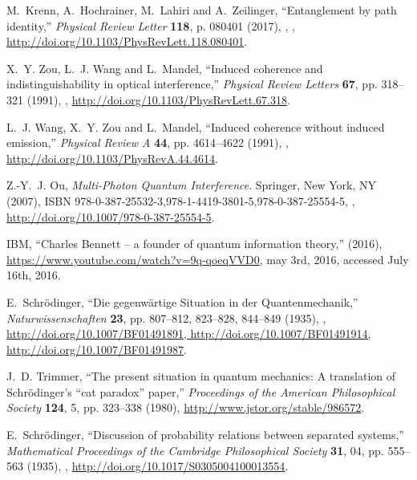 \documentclass{ws-book9x6}
\begin{document}
\begin{thebibliography}{24}
M.~Krenn, A.~Hochrainer, M.~Lahiri and A.~Zeilinger, \enquote{Entanglement by
  path identity,} \emph{Physical Review Letter} \textbf{118}, p. 080401 (2017),
  ,
  \href{http://arxiv.org/abs/arXiv:1610.00642}{},
  \url{http://doi.org/10.1103/PhysRevLett.118.080401}.

X.~Y. Zou, L.~J. Wang and L.~Mandel, \enquote{Induced coherence and
  indistinguishability in optical interference,} \emph{Physical Review Letters}
  \textbf{67}, pp. 318--321 (1991), ,
  \url{http://doi.org/10.1103/PhysRevLett.67.318}.

L.~J. Wang, X.~Y. Zou and L.~Mandel, \enquote{Induced coherence without induced
  emission,} \emph{Physical Review A} \textbf{44}, pp. 4614--4622 (1991),
  ,
  \url{http://doi.org/10.1103/PhysRevA.44.4614}.

Z.-Y.~J. Ou, \emph{Multi-Photon Quantum Interference}.
\newblock Springer, New York, NY (2007), ISBN
  978-0-387-25532-3,978-1-4419-3801-5,978-0-387-25554-5,
  ,
  \url{http://doi.org/10.1007/978-0-387-25554-5}.

IBM, \enquote{{C}harles {B}ennett -- a founder of quantum information theory,}
  (2016), \url{https://www.youtube.com/watch?v=9q-qoeqVVD0}, may 3rd, 2016,
  accessed July 16th, 2016.

E.~Schr{\"{o}}dinger, \enquote{Die gegenw{\"{a}}rtige {S}ituation in der
  {Q}uantenmechanik,} \emph{Naturwissenschaften} \textbf{23}, pp. 807--812,
  823--828, 844--849 (1935), , \url{http://doi.org/10.1007/BF01491891,
  http://doi.org/10.1007/BF01491914, http://doi.org/10.1007/BF01491987}.

J.~D. Trimmer, \enquote{The present situation in quantum mechanics: A
  translation of {S}chr\"odinger's ``cat paradox'' paper,} \emph{Proceedings of
  the American Philosophical Society} \textbf{124}, 5, pp. 323--338 (1980),
  \url{http://www.jstor.org/stable/986572}.

E.~Schr{\"{o}}dinger, \enquote{Discussion of probability relations between
  separated systems,} \emph{Mathematical Proceedings of the Cambridge
  Philosophical Society} \textbf{31}, 04, pp. 555--563 (1935),
  ,
  \url{http://doi.org/10.1017/S0305004100013554}.


\end{thebibliography}
\end{document}

